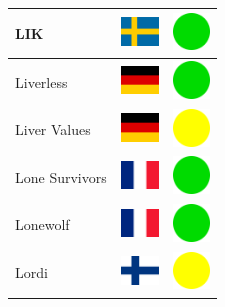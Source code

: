\documentclass[12pt, a4paper, twoside]{report}
\begin{document}
\begin{center}
\begin{longtable}{|p{5cm}|p{2cm}|p{2cm}|}
 LIK                                                        & \includegraphics[width=1cm]{../4x3/se} &   \includegraphics[width=1cm]{../likes/y} \\ \hline
 Liverless                                                  & \includegraphics[width=1cm]{../4x3/de} &   \includegraphics[width=1cm]{../likes/y} \\ \hline
 Liver Values                                               & \includegraphics[width=1cm]{../4x3/de} &   \includegraphics[width=1cm]{../likes/m} \\ \hline
 Lone Survivors                                             & \includegraphics[width=1cm]{../4x3/fr} &   \includegraphics[width=1cm]{../likes/y} \\ \hline
 Lonewolf                                                   & \includegraphics[width=1cm]{../4x3/fr} &   \includegraphics[width=1cm]{../likes/y} \\ \hline
 Lordi                                                      & \includegraphics[width=1cm]{../4x3/fi} &   \includegraphics[width=1cm]{../likes/m} \\ \hline

\end{longtable}
\end{center}
\end{document}

